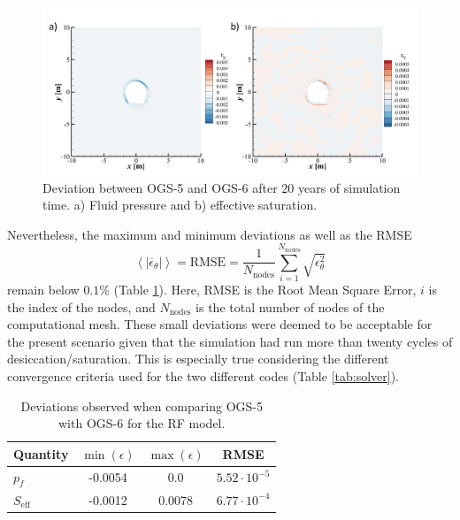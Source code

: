 \begin{figure}[t]
\includegraphics[width=\textwidth, trim=0.6cm 0.0cm 0.0cm 0.2cm, clip]{./figures/MEX10_cf_P_S_2D.png}
\caption{Deviation between OGS-5 and OGS-6 after 20 years of simulation time. a) Fluid pressure and b) effective saturation.}
\label{fig:error}
\end{figure}

Nevertheless, the maximum and minimum deviations as well as the RMSE
\begin{equation}\label{eq:RMSE}
\left \langle \left \lvert \overline{\epsilon}_\theta \right \rvert \right \rangle = \text{RMSE}=\frac{1}{N_\text{nodes}}\sum_{i=1}^{N_\text{nodes}} \sqrt{\epsilon_\theta^2}
\end{equation}
remain below $0.1\%$  (Table \ref{tab:error}). Here, RMSE is the Root Mean Square Error, $i$ is the index of the nodes, and $N_\text{nodes}$ is the total number of nodes of the computational mesh. These small deviations were deemed to be acceptable for the present scenario given that the simulation had run more than twenty cycles of desiccation/saturation.  This is especially true considering the different convergence criteria used for the two different codes (Table \ref{tab:solver}). 

\begin{table}
 \caption{Deviations observed when comparing OGS-5 with OGS-6 for the RF model.\label{tab:error}}
\begin{center}
\begin{tabular}{ l | c | c | c }
 Quantity			& $\min{(\epsilon)}$ 	& $\max{(\epsilon)}$	 & RMSE  \\
 \hline
 $p_f$ & -0.0054 	& 0.0 		& $5.52\cdot 10^{-5}$\\ 
 $S_\text{eff}$ & -0.0012 & 0.0078	& $6.77\cdot 10^{-4}$\\		
\end{tabular}
\end{center}
\end{table}

